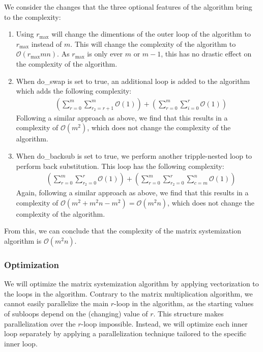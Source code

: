 \documentclass[11pt,a4paper]{report}
\theoremstyle{definition}
\begin{document}
We consider the changes that the three optional features of the algorithm bring to the complexity:
\begin{enumerate}
  \item Using $r_\text{max}$ will change the dimentions of the outer loop of the algorithm to $r_\text{max}$ instead of $m$. This will change the complexity of the algorithm to $\mathcal{O}(r_\text{max}mn)$. As $r_\text{max}$ is only ever $m$ or $m-1$, this has no drastic effect on the complexity of the algorithm.
  \item When do\_swap is set to true, an additional loop is added to the algorithm which adds the following complexity:
  \begin{align*}
    & \left( \sum_{r=0}^{m} \sum_{r_2=r+1}^{m} \mathcal{O}(1) \right) + \left( \sum_{r=0}^{m} \sum_{i=0}^{r} \mathcal{O}(1) \right)
  \end{align*}
  Following a similar approach as above, we find that this results in a complexity of $\mathcal{O}(m^2)$, which does not change the complexity of the algorithm.
  \item When do\_backsub is set to true, we perform another tripple-nested loop to perform back substitution. This loop has the following complexity:
  \begin{align*}
    & \left( \sum_{r=0}^{m} \sum_{r_2=0}^{r} \mathcal{O}(1) \right) + \left( \sum_{r=0}^{m} \sum_{r_2=0}^{r} \sum_{c=m}^{n} \mathcal{O}(1) \right)
  \end{align*}
  Again, following a similar approach as above, we find that this results in a complexity of $\mathcal{O}(m^2 + m^2n - m^2) = \mathcal{O}(m^2n)$, which does not change the complexity of the algorithm.
\end{enumerate}
From this, we can conclude that the complexity of the matrix systemization algorithm is $\mathcal{O}(m^2n)$.

\subsubsection{Optimization}
\label{sec:matrixsystemizationoptimization}
We will optimize the matrix systemization algorithm by applying vectorization to the loops in the algorithm. Contrary to the matrix multiplication algorithm, we cannot easily parallelize the main $r$-loop in the algorithm, as the starting values of subloops depend on the (changing) value of $r$. This structure makes parallelization over the $r$-loop impossible. Instead, we will optimize each inner loop separately by applying a parallelization technique tailored to the specific inner loop.
\end{document}

